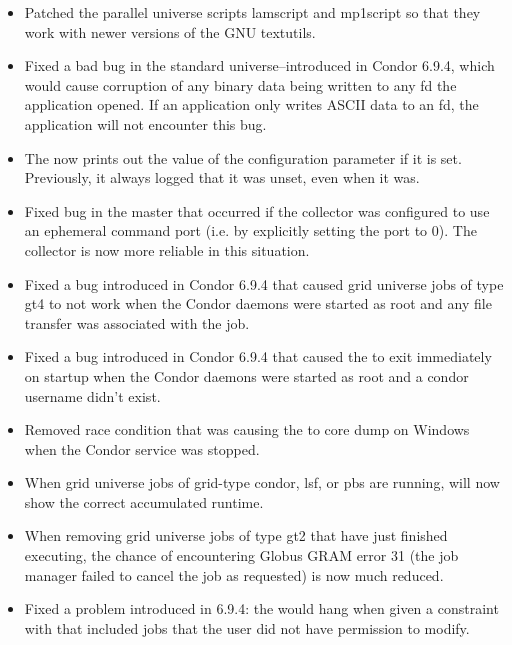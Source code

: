 \begin{itemize}

\item Patched the parallel universe scripts lamscript and mp1script
so that they work with newer versions of the GNU textutils.

\item Fixed a bad bug in the standard universe--introduced in Condor
6.9.4,  which would cause corruption of any binary data being written to
any fd the application opened. If an application only writes ASCII data
to an fd, the application will not encounter this bug.

\item The  now prints out the value of the configuration
	parameter  if it is set.  Previously,
	it always logged that it was unset, even when it was.

\item Fixed bug in the master that occurred if the collector
	was configured to use an ephemeral command port 
	(i.e. by explicitly setting the port to 0).	  The collector
	is now more reliable in this situation.

\item Fixed a bug introduced in Condor 6.9.4 that caused grid universe
jobs of type gt4 to not work when the Condor daemons were started as
root and any file transfer was associated with the job.

\item Fixed a bug introduced in Condor 6.9.4 that caused the
 to exit immediately on startup when the Condor
daemons were started as root and a condor username didn't exist.

\item Removed race condition that was causing the  to core
  dump on Windows when the Condor service was stopped.

\item When grid universe jobs of grid-type condor, lsf, or pbs are running,
 will now show the correct accumulated runtime.

\item When removing grid universe jobs of type gt2 that have just finished
executing, the chance of encountering Globus GRAM error 31 (the job manager
failed to cancel the job as requested) is now much reduced.

\item Fixed a problem introduced in 6.9.4: the  would hang
when given a constraint with  that included jobs that the user
did not have permission to modify.


\end{itemize}

